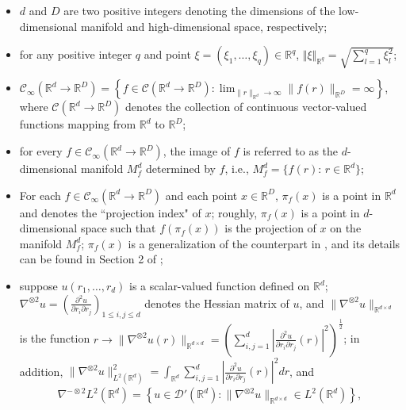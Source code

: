 \documentclass[11pt,reqno]{article}
\theoremstyle{definition}
\begin{document}
\begin{itemize}
\item $d$ and $D$ are two positive integers denoting the dimensions of the low-dimensional manifold and high-dimensional space, respectively; 
\item for any positive integer $q$ and point $\xi=(\xi_1,\ldots,\xi_q)\in\mathbb{R}^q$, $\Vert \xi\Vert_{\mathbb{R}^q}=\sqrt{\sum_{l=1}^q \xi_l^2}$;
    \item $\mathcal{C}_{\infty}(\mathbb{R}^{d} \to \mathbb{R}^{D}) = \left\{f \in \mathcal{C}(\mathbb{R}^{d} \to \mathbb{R}^{D}): \lim_{\|r\|_{\mathbb{R}^{d}} \to \infty}\|f(r)\|_{\mathbb{R}^{D}} = \infty\right\}$, where $\mathcal{C}(\mathbb{R}^{d} \to \mathbb{R}^{D})$ denotes the collection of continuous vector-valued functions mapping from $\mathbb{R}^d$ to $\mathbb{R}^D$; 
    \item for every $f\in \mathcal{C}_{\infty}(\mathbb{R}^{d} \to \mathbb{R}^{D})$, the image of $f$ is referred to as the $d$-dimensional manifold $M_f^d$ determined by $f$, i.e., $M_f^d=\{f(r):\,r\in\mathbb{R}^d\}$;
    \item For each $f\in \mathcal{C}_{\infty}(\mathbb{R}^{d} \to \mathbb{R}^{D})$ and each point $x\in\mathbb{R}^D$, $\pi_f(x)$ is a point in $\mathbb{R}^d$ and denotes the ``projection index" of $x$; roughly, $\pi_f(x)$ is a point in $d$-dimensional space such that $f(\pi_f(x))$ is the projection of $x$ on the manifold $M_f^d$; $\pi_f(x)$ is a generalization of the counterpart in \cite{hastiePrincipalCurves1989}, and its details can be found in Section 2 of \cite{mengPrincipalManifoldEstimation2021};
    \item suppose $u(r_1,\ldots,r_d)$ is a scalar-valued function defined on $\mathbb{R}^d$; $\nabla^{\otimes 2}u=\left(\frac{\partial^2 u}{\partial r_i \partial r_j}\right)_{1\le i,j\le d}$ denotes the Hessian matrix of $u$, and $\|\nabla^{\otimes 2}u\|_{\mathbb{R}^{d \times d}}$ is the function $r \to \|\nabla^{\otimes 2} u(r)\|_{\mathbb{R}^{d \times d}} = \left(\sum_{i, j = 1}^{d}\left|\frac{\partial^2 u}{\partial r_i \partial r_j}(r)\right|^2\right)^{\frac{1}{2}}$; in addition, $\|\nabla^{\otimes 2} u\|_{L^2(\mathbb{R}^{d})}^2 = \int_{\mathbb{R}^{d}}\sum_{i, j = 1}^{d}\left|\frac{\partial^2 u}{\partial r_i \partial r_j}(r)\right|^2dr $, and 
    \begin{align*}
        \nabla^{-\otimes 2}L^2(\mathbb{R}^{d}) = \left\{u \in \mathcal{D}'(\mathbb{R}^{d}): \|\nabla^{\otimes 2} u\|_{\mathbb{R}^{d \times d}} \in L^2(\mathbb{R}^{d})\right\},
    \end{align*}

\end{itemize}
\end{document}
